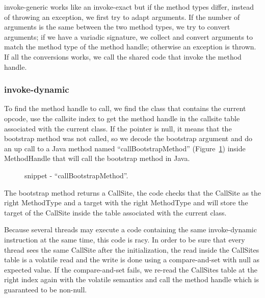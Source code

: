 \documentclass{sig-alternate}
\begin{document}
      invoke-generic works like an invoke-exact but if the method types differ, instead of throwing an exception,
      we first try to adapt arguments.
      If the number of arguments is the same between the two method types, we try to convert arguments;
      if we have a variadic signature, we collect and convert arguments to match the method type of the method handle;
      otherwise an exception is thrown.
      If all the conversions works, we call the shared code that invoke the method handle.
  
    \subsubsection{invoke-dynamic}
      To find the method handle to call, we find the class that contains the current opcode,
      use the callsite index to get the method handle
      in the callsite table associated with the current class.
      If the pointer is null, it means that the bootstrap method was not called,
      so we decode the bootstrap argument and do an up call to a Java method named ``callBootstrapMethod'' (Figure~\ref{implBSM})
      inside MethodHandle that will call the bootstrap method in Java.
      
      \begin{figure}[!ht]
        \centering \vspace{-1.5em}
        \caption{snippet - ``callBootstrapMethod''.}\vspace{-1em}
        \label{implBSM}
      \end{figure}

      The bootstrap method returns a CallSite, the code checks that the CallSite as the right MethodType
      and a target with the right MethodType and will store the target of the CallSite inside the table
      associated with the current class.

      Because several threads may execute a code containing the same invoke-dynamic instruction
      at the same time, this code is racy. In order to be sure that every thread sees the same CallSite
      after the initialization, the read inside the CallSites table is a volatile read and the write
      is done using a compare-and-set with null as expected value.
      If the compare-and-set fails, we re-read the CallSites table at the right index again with the volatile semantics
      and call the method handle which is guaranteed to be non-null.   
\end{document}
